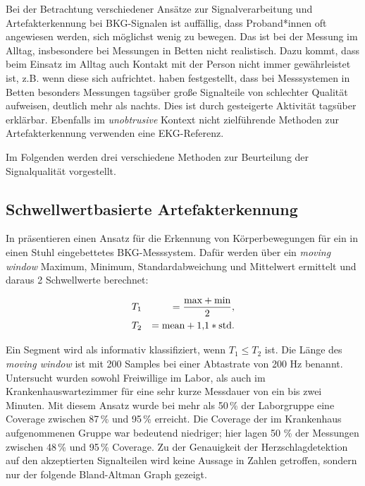 		
	Bei der Betrachtung verschiedener Ansätze zur Signalverarbeitung und Artefakterkennung bei \ac{BKG}-Signalen ist auffällig, dass Proband*innen oft angewiesen werden, sich möglichst wenig zu bewegen. Das ist bei der Messung im Alltag, insbesondere bei Messungen in Betten nicht realistisch. Dazu kommt, dass beim Einsatz im Alltag auch Kontakt mit der Person nicht immer gewährleistet ist, z.B. wenn diese sich aufrichtet. \citeauthor{HoogAntink2020} haben festgestellt, dass bei Messsystemen in Betten besonders Messungen tagsüber große Signalteile von schlechter Qualität aufweisen, deutlich mehr als nachts. Dies ist durch gesteigerte Aktivität tagsüber erklärbar. Ebenfalls im \textit{unobtrusive} Kontext nicht zielführende Methoden zur Artefakterkennung verwenden eine \ac{EKG}-Referenz.
	
	Im Folgenden werden drei verschiedene Methoden zur Beurteilung der Signalqualität vorgestellt.

	\subsection{Schwellwertbasierte Artefakterkennung}
	
	In  präsentieren \citeauthor{Pino2015} einen Ansatz für die Erkennung von Körperbewegungen für ein in einen Stuhl eingebettetes \ac{BKG}-Messsystem. Dafür werden über ein \textit{moving window} Maximum, Minimum, Standardabweichung und Mittelwert ermittelt und daraus 2 Schwellwerte berechnet:
	
	\begin{eqnarray*}
		&T_1 &= \frac{\text{max} + \text{min}}{2},\notag\\
		&T_2 &= \text{mean} + 1{,}1 * \text{std}.\notag
	\end{eqnarray*}
	
	Ein Segment wird als informativ klassifiziert, wenn $T_1 \leq T_2$ ist. Die Länge des \textit{moving window} ist mit 200 Samples bei einer Abtastrate von 200 Hz benannt. Untersucht wurden sowohl Freiwillige im Labor, als auch im Krankenhauswartezimmer für eine sehr kurze Messdauer von ein bis zwei Minuten. Mit diesem Ansatz wurde bei mehr als 50\,\% der Laborgruppe eine Coverage zwischen 87\,\% und 95\,\% erreicht. Die Coverage der im Krankenhaus aufgenommenen Gruppe war bedeutend niedriger; hier lagen 50 \% der Messungen zwischen 48\,\% und 95\,\% Coverage. Zu der Genauigkeit der Herzschlagdetektion auf den akzeptierten Signalteilen wird keine Aussage in Zahlen getroffen, sondern nur der folgende Bland-Altman Graph gezeigt.
	
